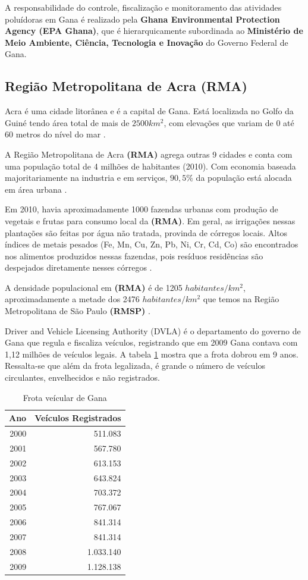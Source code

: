 A responsabilidade do controle, fiscalização e monitoramento das 
atividades poluídoras em Gana é realizado pela 
\textbf{Ghana Environmental Protection Agency (EPA Ghana)}, que é 
hierarquicamente subordinada ao 
\textbf{Ministério de Meio Ambiente, Ciência, Tecnologia e Inovação} do 
Governo Federal de Gana.

\subsection{Região Metropolitana de Acra \textbf{(RMA)}}

Acra é uma cidade litorânea e é a capital de Gana. Está localizada 
no Golfo da Guiné tendo área total de mais de  $2500 km^2$, com elevações que 
variam de 0 até 60 metros do nível do mar \citep{ARKU2008}.

A Região Metropolitana de Acra \textbf{(RMA)} agrega outras 9 cidades e 
conta com uma população total de 4 milhões de habitantes (2010). 
Com economia baseada majoritariamente na industria e em serviços, 
$90,5\%$ da população está alocada em área urbana \citep{ghanacensus2013}.

Em 2010, havia aproximadamente 1000 fazendas urbanas com produção de vegetais e
frutas para consumo local da \textbf{(RMA)}. Em geral, as irrigações nessas plantações
são feitas por água não tratada, provinda de córregos locais. 
Altos índices de metais pesados (Fe, Mn, Cu, Zn, Pb, Ni, Cr, Cd, Co)
são encontrados nos alimentos produzidos nessas fazendas, pois resíduos
residências são despejados diretamente nesses córregos \citep{lente2014}.

A densidade populacional em \textbf{(RMA)} é de 1205 $habitantes/km^2$, 
aproximadamente a metade dos 2476 $habitantes/km^2$ que temos na 
Região Metropolitana de São Paulo \textbf{(RMSP)} \citep{ibge2011}. 

Driver and Vehicle Licensing Authority (DVLA) é o
departamento do governo de Gana que regula e fiscaliza veículos, 
registrando que em 2009 Gana contava com 1,12 milhões de veículos legais. 
A tabela \ref{table:dvla} mostra que a frota dobrou em 9 anos.
Ressalta-se que além da frota legalizada, é grande o número de veículos circulantes, 
envelhecidos e não registrados. 

\begin{table}[H]
 \centering
  \begin{tabular}{rr}
  \hline
  Ano & Veículos Registrados \\ 
  \hline
  2000 & 511.083 \\ 
  2001 & 567.780 \\ 
  2002 & 613.153 \\ 
  2003 & 643.824 \\ 
  2004 & 703.372 \\ 
  2005 & 767.067 \\ 
  2006 & 841.314 \\ 
  2007 & 841.314 \\ 
  2008 & 1.033.140 \\ 
  2009 & 1.128.138 \\ 
  \hline
  \end{tabular}
  \caption{Frota veícular de Gana \citep{dvla} \label{table:dvla}}
\end{table}

